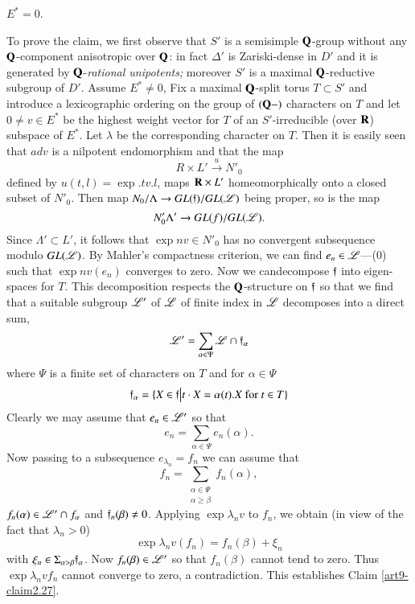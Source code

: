 \setcounter{claim}{26}
\begin{claim}\label{art9-claim2.27}
$E^\ast = 0$.
\end{claim}

To prove the claim, we first observe that $S'$ is a semisimple $\mathbf{Q}$-group without any $\mathbf{Q}$-component anisotropic over $\mathbf{Q}$: in fact $\Delta'$ is Zariski-dense in $D'$ and it is generated by $\mathbf{Q}$-\textit{rational unipotents;} moreover $S'$ is a maximal $\mathbf{Q}$-reductive subgroup of $D'$. Assume  $E^\ast \neq 0$, Fix a maximal $\mathbf{Q}$-split torus $T \subset S'$ and introduce a lexicographic ordering on the group of $(\mathbf{Q}-)$ characters on $T$ and let $0 \neq v \in E^\ast$ be the highest weight vector for $T$ of an $S'$-irreducible (over $\mathbf{R}$) subspace of $E^\ast$. Let $\lambda$ be the corresponding character on $T$. Then it is easily seen that $ad v$ is a nilpotent endomorphism and that the map
$$
R \times L' \xrightarrow{u} N'_0
$$
defined by $u (t, l)=\exp. t v. l$, maps $\mathbf{R}\times L'$ homeomorphically onto a closed subset of $N'_0$. Then map $N_0/\Lambda \to G L (\mathfrak{f})/ GL (\mathscr{L})$ being proper, so is the map
$$
N'_0 \Lambda' \to GL (f) / GL (\mathscr{L}).
$$
Since $\Lambda' \subset L'$, it follows that $\exp n v \in N'_0$ has no convergent subsequence modulo $GL(\mathscr{L})$. By Mahler's compactness criterion, we can find $e_n \in \mathscr{L} $---(0) such that $\exp n v (e_n)$ converges to zero. Now  we can\pageoriginale decompose $\mathfrak{f}$ into eigen-spaces for $T$. This decomposition respects the $\mathbf{Q}$-structure on $\mathfrak{f}$ so that we find that a suitable subgroup $\mathscr{L}'$ of $\mathscr{L}$ of finite index in $\mathscr{L}$ decomposes into a direct sum,
$$
\mathscr{L}' = \sum\limits_{\alpha \in \Psi} \mathscr{L} \cap \mathfrak{f}_\alpha
$$
where $\Psi$ is a finite set of characters on $T$ and for $\alpha \in \Psi$
$$
\mathfrak{f}_\alpha = \{X \in \mathfrak{f} \big| t\cdot X = \alpha (t). X \text{ for } t \in T \}
$$
Clearly we may assume that $e_n \in \mathscr{L}'$ so that 
$$
e_n = \sum\limits_{\alpha \in \Psi} e_n (\alpha).
$$
Now passing to a subsequence $e_{\lambda_n} = f_n$ we can assume that
$$
f_n = \sum\limits_{\substack{\alpha \in \Psi\\ \alpha \geqslant \beta}} f_n (\alpha),
$$
$f_n (\alpha) \in\mathscr{L}' \cap f_\alpha$ and $\mathfrak{f}_n (\beta) \neq 0$. Applying $\exp \lambda_n v$ to $f_n$, we obtain (in view of the fact that $\lambda_n > 0$)
$$
\exp \lambda_n v (f_n) = f_n (\beta) + \xi_n
$$
with $\xi_n \in \Sigma_{\alpha > \beta} \mathfrak{f}_\alpha$. Now $f_n (\beta) \in \mathscr{L}'$ so that $f_n(\beta)$ cannot tend to zero. Thus $\exp \lambda_n vf_n$ cannot converge to zero, a contradiction. This establishes Claim \ref{art9-claim2.27}.

